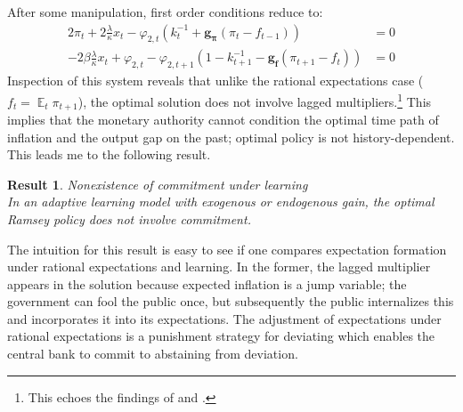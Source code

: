 \documentclass[11pt]{article}
\renewcommand{\[}{\begin{equation}}
\renewcommand{\]}{\end{equation}}
\newtheorem{result}{Result}
\DeclareMathOperator{\E}{\mathbb{E}}
\begin{document}
 After some manipulation, first order conditions reduce to:
 \begin{align}
  2\pi_t +2\frac{\lambda}{\kappa}x_t -\varphi_{2,t}(k_t^{-1} + \mathbf{g_{\pi}}(\pi_t -f_{t-1}))& = 0 \label{simpleFOC1} \\
  -2\beta\frac{\lambda}{\kappa}x_t + \varphi_{2,t} -\varphi_{2,t+1}(1-k_{t+1}^{-1} -\mathbf{g_{f}}(\pi_{t+1} -f_{t})) & = 0 \label{simpleFOC2} 
 \end{align}
Inspection of this system reveals that unlike the rational expectations case ($f_t = \E_t{\pi_{t+1}}$), the optimal solution does not involve lagged multipliers.\footnote{This echoes the findings of \cite{molnar2014optimal} and \cite{gaspar2010inflation}.} This implies that the monetary authority cannot condition the optimal time path of inflation and the output gap on the past; optimal policy is not history-dependent. This leads me to the following result.

\begin{result} Nonexistence of commitment under learning \\
In an adaptive learning model with exogenous or endogenous gain, the optimal Ramsey policy does not involve commitment. 
\label{result_no_commitment}
\end{result}

The intuition for this result is easy to see if one compares expectation formation under rational expectations and learning. In the former, the lagged multiplier appears in the solution because expected inflation is a jump variable; the government can fool the public once, but subsequently the public internalizes this and incorporates it into its expectations. The adjustment of expectations under rational expectations is a punishment strategy for deviating which enables the central bank to commit to abstaining from deviation. 
\end{document}
